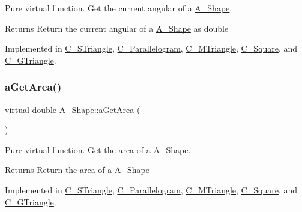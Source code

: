 Pure virtual function. Get the current angular of a \hyperlink{classA__Shape}{A\+\_\+\+Shape}. 

\begin{DoxyReturn}{Returns}
Return the current angular of a \hyperlink{classA__Shape}{A\+\_\+\+Shape} as double 
\end{DoxyReturn}


Implemented in \hyperlink{classC__STriangle_a38304830925938339c4a4a0ad812e151}{C\+\_\+\+S\+Triangle}, \hyperlink{classC__Parallelogram_a51959da2b0cf083767f39d8065f395f2}{C\+\_\+\+Parallelogram}, \hyperlink{classC__MTriangle_aad1e42f1ec9c486736a403128ba47179}{C\+\_\+\+M\+Triangle}, \hyperlink{classC__Square_ac7779503b305fda4147b735622c66f81}{C\+\_\+\+Square}, and \hyperlink{classC__GTriangle_a98866648972bb78707c61aa7ebc22fb9}{C\+\_\+\+G\+Triangle}.

\mbox{\label{classA__Shape_a1b142ee2d873d6c217f65de1632e7b6e}} 
\subsubsection{\texorpdfstring{a\+Get\+Area()}{aGetArea()}}
{\footnotesize\ttfamily virtual double A\+\_\+\+Shape\+::a\+Get\+Area (\begin{DoxyParamCaption}{ }\end{DoxyParamCaption})\hspace{0.3cm}{\ttfamily [pure virtual]}}



Pure virtual function. Get the area of a \hyperlink{classA__Shape}{A\+\_\+\+Shape}. 

\begin{DoxyReturn}{Returns}
Return the area of a \hyperlink{classA__Shape}{A\+\_\+\+Shape} 
\end{DoxyReturn}


Implemented in \hyperlink{classC__STriangle_aaff25f3c7f7640c3e7c735a77800e96e}{C\+\_\+\+S\+Triangle}, \hyperlink{classC__Parallelogram_a72b4509a33ee27331e5b9bdc8a3278e8}{C\+\_\+\+Parallelogram}, \hyperlink{classC__MTriangle_a1baff5085fc1b9822987e3fc307550ce}{C\+\_\+\+M\+Triangle}, \hyperlink{classC__Square_affd2be59872618d5d1955be360fb73e6}{C\+\_\+\+Square}, and \hyperlink{classC__GTriangle_a4d1c9a050aef86a7eab973b1fe668544}{C\+\_\+\+G\+Triangle}.

\mbox{\label{classA__Shape_a1e90c8132d33e4ac84d42f72606193b2}} 
